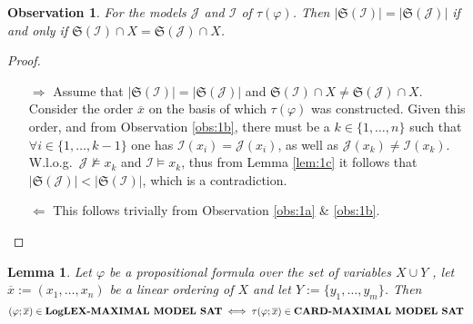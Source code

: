 \documentclass [11pt]{article}
\newcommand{\MAXCARDSAT}{\mbox{\bf CARD-MAXIMAL MODEL SAT}}
\newcommand{\LogMAXLEXSAT}{\mbox{\bf LogLEX-MAXIMAL MODEL SAT}}
\newcommand{\nmodels}{\not\models}
\newtheorem{lemma}[theorem]{Lemma}
\newtheorem{observation}[theorem]{Observation}
\begin{document}
\begin{observation}
\label{obs:1d}
For the models $\mathcal{J}$ and $\mathcal{I}$ of $\tau(\varphi)$. Then $|\mathfrak{S}(\mathcal{I})|=|\mathfrak{S}(\mathcal{J})|$ if and only if $\mathfrak{S}(\mathcal{I}) \cap X= \mathfrak{S}(\mathcal{J}) \cap X$.
\end{observation}
\begin{proof}
\begin{itemize}
\item[$\Rightarrow$]
Assume that $|\mathfrak{S}(\mathcal{I})|=|\mathfrak{S}(\mathcal{J})|$ and $\mathfrak{S}(\mathcal{I}) \cap X\neq \mathfrak{S}(\mathcal{J}) \cap X$.  Consider the order $\overline{x}$ on the basis of which $\tau(\varphi)$ was constructed. Given this order, and from Observation \ref{obs:1b}, there must be a $k \in \{1, \dots , n \}$ such that $\forall i \in  \{1, \dots , k-1 \}$ one has $\mathcal{I}(x_i)=\mathcal{J}(x_i)$, as well as $\mathcal{J}(x_k) \neq \mathcal{I}(x_k)$. W.l.o.g.\  $\mathcal{J} \nmodels x_k$ and $\mathcal{I}  \models x_k$, thus from Lemma \ref{lem:1c} it follows that $|\mathfrak{S}(\mathcal{J})| < |\mathfrak{S}(\mathcal{I}) |$, which is a contradiction.

\item[$\Leftarrow$] This follows trivially from Observation \ref{obs:1a} \& \ref{obs:1b}.
\end{itemize}

\end{proof}



\begin{lemma}
Let $\varphi$ be a propositional formula over the set of variables $X \cup Y$ , let $\overline{x}:=(x_1,\dots,x_n)$ be a linear ordering of $X$ and let $Y:=\{y_1, \dots, y_m\}$. Then
\small
\begin{equation*}
(\varphi;\overline{x}) \in \LogMAXLEXSAT \iff \tau(\varphi;\overline{x}) \in \MAXCARDSAT
\end{equation*}
\end{lemma}
\end{document}

